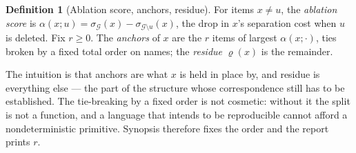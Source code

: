 \documentclass[11pt,twocolumn,a4paper]{article}
\theoremstyle{plain}
\theoremstyle{definition}
\newtheorem{definition}[theorem]{Definition}
\theoremstyle{remark}
\newcommand{\sep}{\sigma}                      %
\newcommand{\Res}{\varrho}                     %
\newcommand{\Gph}{\mathcal{G}}
\begin{document}
\begin{definition}[Ablation score, anchors, residue]
\label{def:anchor}
For items $x\ne u$, the \emph{ablation score} is
$\alpha(x;u)=\sep_\Gph(x)-\sep_{\Gph\setminus u}(x)$, the drop in $x$'s
separation cost when $u$ is deleted. Fix $r\ge0$. The \emph{anchors} of
$x$ are the $r$ items of largest $\alpha(x;\cdot)$, ties broken by a
fixed total order on names; the \emph{residue} $\Res(x)$ is the
remainder.
\end{definition}

The intuition is that anchors are what $x$ is held in place by, and
residue is everything else --- the part of the structure whose
correspondence still has to be established. The tie-breaking by a fixed
order is not cosmetic: without it the split is not a function, and a
language that intends to be reproducible cannot afford a
nondeterministic primitive. Synopsis therefore fixes the order and the
report prints $r$.
\end{document}
